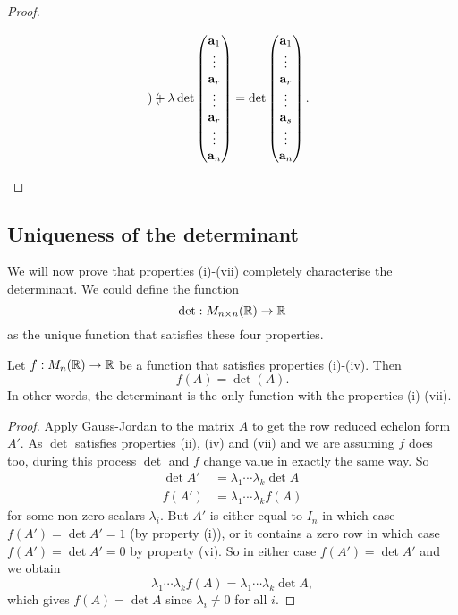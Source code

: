 \documentclass[10pt, a4paper]{article}
\begin{document}
\begin{enumerate}[label = (\roman*)]
\begin{proof}
\begin{enumerate}[label = (\roman*)]
\[\begin{pmatrix}
            \end{pmatrix}
            +
            \lambda
            \det\begin{pmatrix}
                \mathbf{a}_1 \\ \vdots \\ \mathbf{a}_r \\ \vdots \\ \mathbf{a}_r \\ \vdots \\ \mathbf{a}_n
            \end{pmatrix}
            =
            \det\begin{pmatrix}
                \mathbf{a}_1 \\ \vdots \\ \mathbf{a}_r \\ \vdots \\ \mathbf{a}_s \\ \vdots \\ \mathbf{a}_n
            \end{pmatrix}.
            \]
        \end{enumerate}
    \end{proof}
\end{enumerate}

\subsection{Uniqueness of the determinant}
We will now prove that properties (i)-(vii) completely characterise the determinant.
We could define the function
\[
\det : M_{n \times n}(\mathbb{R}) \rightarrow \mathbb{R}
\]
as the unique function that satisfies these four properties.
\begin{theorem}\label{pre_linalg_thm_uniquedet}
    Let $f: M_n(\mathbb{R}) \rightarrow \mathbb{R}$ be a function that satisfies properties (i)-(iv).
    Then
    \[
    f(A) = \det(A).
    \]
    In other words,
    the determinant is the only function with the properties (i)-(vii).
    \begin{proof}
        Apply Gauss-Jordan to the matrix $A$ to get the row reduced echelon form $A'$.
        As $\det$ satisfies properties (ii), (iv) and (vii) and we are assuming $f$ does too,
        during this process $\det$ and $f$ change value in exactly the same way.
        So
        \begin{align*}
            \det A' &= \lambda_1\dotsi\lambda_k\det A \\
            f(A') &= \lambda_1\dotsi\lambda_kf(A)
        \end{align*}
        for some non-zero scalars $\lambda_i$.
        But $A'$ is either equal to $I_n$ in which case $f(A') = \det A' = 1$ (by property (i)),
        or it contains a zero row in which case $f(A') = \det A' = 0$ by property (vi).
        So in either case $f(A') = \det A'$ and we obtain
        \[
        \lambda_1\dotsi\lambda_kf(A) = \lambda_1\dotsi\lambda_k\det A,
        \]
        which gives $f(A) = \det A$ since $\lambda_i \neq 0$ for all $i$.
    \end{proof}
\end{theorem}
\end{document}
